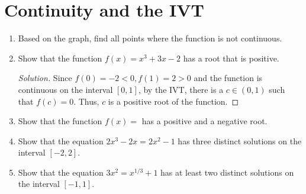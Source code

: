 \documentclass[12pt]{article}
\newenvironment{solution}{\begin{proof}[Solution]}{\end{proof}}
\begin{document}
	\section{Continuity and the IVT}
	\begin{enumerate}
		\item Based on the graph, find all points where the function is not continuous.
		\item Show that the function $f(x)=x^3+3x-2$ has a root that is positive.
		\begin{solution}
			Since $f(0)=-2<0, f(1)=2>0$ and the function is continuous on the interval $[0,1]$, by the IVT, there is a $c\in (0,1)$ such that $f(c)=0$. Thus, $c$ is a positive root of the function.
		\end{solution}
		\item Show that the function $f(x)=$ has a positive and a negative root.
		\item Show that the equation $2x^3-2x=2x^2-1$ has three distinct solutions on the interval $[-2,2]$.
		\item Show that the equation $3x^2=x^{1/3}+1$ has at least two distinct solutions on the interval $[-1,1]$.
	\end{enumerate}
		
\end{document}
